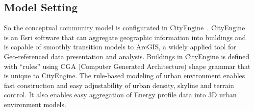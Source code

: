 \documentclass[hidelinks,12pt]{article}
\begin{document}
\subsection{Model Setting}
So the conceptual community model is configurated in
CityEngine~\cite{cityEngine2015}. CityEngine is an Esri software that
can aggregate geographic information into buildings and is capable of
smoothly transition models to ArcGIS\cite{ArcGIS2015}, a widely
applied tool for Geo-referenced data presentation and
analysis. Buildings in CityEngine is defined with ``rules'' using CGA
(Computer Generated Architecture) shape grammar that is unique to
CityEngine. The rule-based modeling of urban environment enables fast
construction and easy adjustability of urban density, skyline and
terrain control. It also enables easy aggregation of Energy profile
data into 3D urban environment models.
\end{document}
